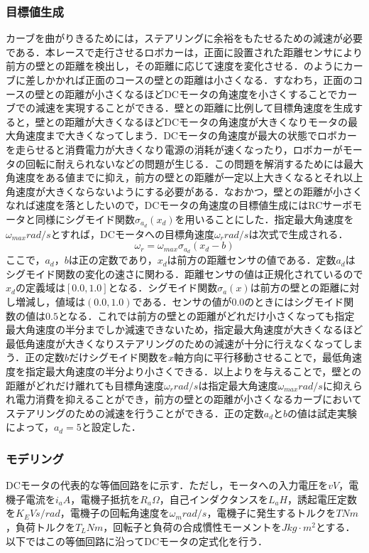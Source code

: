 \subsubsection{目標値生成}
カーブを曲がりきるためには，ステアリングに余裕をもたせるための減速が必要である．本レースで走行させるロボカーは，正面に設置された距離センサにより前方の壁との距離を検出し，その距離に応じて速度を変化させる．のようにカーブに差しかかれば正面のコースの壁との距離は小さくなる．すなわち，正面のコースの壁との距離が小さくなるほどDCモータの角速度を小さくすることでカーブでの減速を実現することができる．壁との距離に比例して目標角速度を生成すると，壁との距離が大きくなるほどDCモータの角速度が大きくなりモータの最大角速度まで大きくなってしまう．DCモータの角速度が最大の状態でロボカーを走らせると消費電力が大きくなり電源の消耗が速くなったり，ロボカーがモータの回転に耐えられないなどの問題が生じる．この問題を解消するためには最大角速度をある値までに抑え，前方の壁との距離が一定以上大きくなるとそれ以上角速度が大きくならないようにする必要がある．なおかつ，壁との距離が小さくなれば速度を落としたいので，DCモータの角速度の目標値生成にはRCサーボモータと同様にシグモイド関数$\sigma_{a_{d}}(x_{d})$を用いることにした．指定最大角速度を$\omega_{max}\unit{rad/s} $とすれば，DCモータへの目標角速度$\omega_{r}\unit{rad/s}$は次式で生成される．
\begin{equation}
 \omega_{r}=\omega_{max}\sigma_{a_{d}}(x_{d}-b)\label{eq::omega_r}
\end{equation}
ここで，$a_{d}$，$b$は正の定数であり，$x_{d}$は前方の距離センサの値である．定数$a_{d}$はシグモイド関数の変化の速さに関わる．距離センサの値は正規化されているので$x_{d}$の定義域は$[0.0,1.0]$となる．シグモイド関数$\sigma_{a}(x)$は前方の壁との距離に対し増減し，値域は$(0.0,1.0)$である．センサの値が$0.0$のときにはシグモイド関数の値は$0.5$となる．これでは前方の壁との距離がどれだけ小さくなっても指定最大角速度の半分までしか減速できないため，指定最大角速度が大きくなるほど最低角速度が大きくなりステアリングのための減速が十分に行えなくなってしまう．正の定数$b$だけシグモイド関数を$x$軸方向に平行移動させることで，最低角速度を指定最大角速度の半分より小さくできる．以上よりを与えることで，壁との距離がどれだけ離れても目標角速度$\omega_{r}\unit{rad/s}$は指定最大角速度$\omega_{max}\unit{rad/s}$に抑えられ電力消費を抑えることができ，前方の壁との距離が小さくなるカーブにおいてステアリングのための減速を行うことができる．正の定数$a_{d}$と$b$の値は試走実験によって，$a_{d}=5$と設定した．

\subsubsection{モデリング}
DCモータの代表的な等価回路をに示す．\cite{dcmmodeling}ただし，モータへの入力電圧を$v\unit{V}$，電機子電流を$i_{a}\unit{A}$，電機子抵抗を$R_{a}\unit{\Omega}$，自己インダクタンスを$L_{a}\unit{H}$，誘起電圧定数を$K_{E}\unit{Vs/rad}$，電機子の回転角速度を$\omega_{m}\unit{rad/s}$，電機子に発生するトルクを$T\unit{Nm}$，負荷トルクを$T_L\unit{Nm}$，回転子と負荷の合成慣性モーメントを$J\unit{kg\cdot m^2}$とする．以下ではこの等価回路に沿ってDCモータの定式化を行う．

